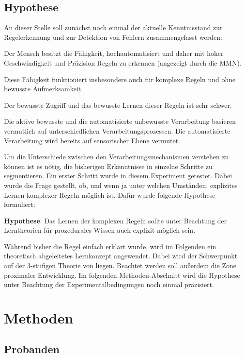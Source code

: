 \documentclass[doc,a4paper,12pt]{apa6}
\begin{document}
\subsection{Hypothese}

An dieser Stelle soll zunächst noch einmal der aktuelle Kenntnisstand zur Regelerkennung und zur Detektion von Fehlern zusammengefasst werden:

\begin{compactitem}
\item Der Mensch besitzt die Fähigkeit, hochautomatisiert und daher mit hoher Geschwindigkeit und Präzision Regeln zu erkennen (angezeigt durch die MMN).
\item Diese Fähigkeit funktioniert insbesondere auch für komplexe Regeln und ohne bewusste Aufmerksamkeit.
\item Der bewusste Zugriff und das bewusste Lernen dieser Regeln ist sehr schwer.
\item Die aktive bewusste und die automatisierte unbewusste Verarbeitung basieren vermutlich auf unterschiedlichen Verarbeitungsprozessen. Die automatisierte Verarbeitung wird bereits auf sensorischer Ebene vermutet.
\end{compactitem}

Um die Unterschiede zwischen den Verarbeitungsmechanismen verstehen zu können ist es nötig, die bisherigen Erkenntnisse in einzelne Schritte zu segmentieren. Ein erster Schritt wurde in diesem Experiment getestet. Dabei wurde die Frage gestellt, ob, und wenn ja unter welchen Umständen, explizites Lernen komplexer Regeln möglich ist. Dafür wurde folgende Hypothese formuliert:

\textbf{Hypothese}: Das Lernen der komplexen Regeln sollte unter Beachtung der Lerntheorien für prozedurales Wissen auch explizit möglich sein.

Während bisher die Regel einfach erklärt wurde, wird im Folgenden ein theoretisch abgeleitetes Lernkonzept angewendet. Dabei wird der Schwerpunkt auf der 3-stufigen Theorie von \textcite{fitts1967human} liegen. Beachtet werden soll außerdem die Zone proximaler Entwicklung. Im folgenden Methoden-Abschnitt wird die Hypothese unter Beachtung der Experimentalbedingungen noch einmal präzisiert.

\section{Methoden}

\subsection{Probanden}
\end{document}
